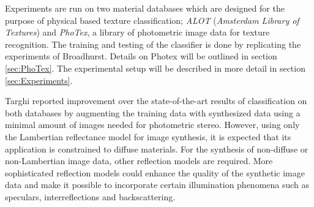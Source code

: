 Experiments are run on two material databases which are designed for the purpose of physical based texture classification; \textit{ALOT} (\textit{Amsterdam Library of Textures}) and \textit{PhoTex}, a library of photometric image data for texture recognition. The training and testing of the classifier is done by replicating the experiments of Broadhurst. Details on Photex will be outlined in section \ref{sec:PhoTex}. The experimental setup will be described in more detail in section \ref{sec:Experiments}.

Targhi reported improvement over the state-of-the-art results of classification on both databases by augmenting the training data with synthesized data using a minimal amount of images needed for photometric stereo. However, using only the Lambertian reflectance model for image synthesis, it is expected that its application is constrained to diffuse materials. For the synthesis of non-diffuse or non-Lambertian image data, other reflection models are required. More sophisticated reflection models could enhance the quality of the synthetic image data and make it possible to incorporate certain illumination phenomena such as speculars, interreflections and backscattering. 

